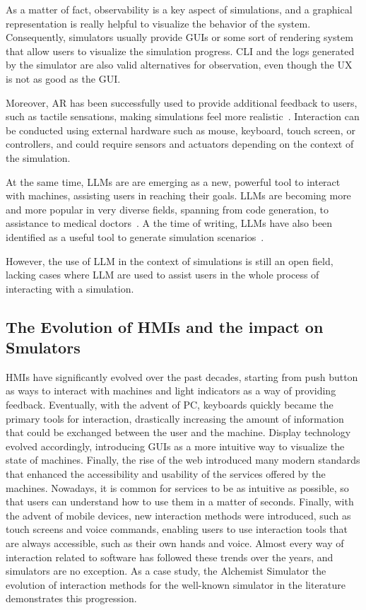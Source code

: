 \documentclass[conference]{IEEEtran}
\begin{document}
As a matter of fact,
observability is a key aspect of simulations,
and a graphical representation is really helpful to visualize the behavior of the system.
%
Consequently,
simulators usually provide \acp{GUI} or some sort of rendering system that allow users to visualize the simulation progress.
%
\ac{CLI} and the logs generated by the simulator are also valid alternatives for observation,
even though the \ac{UX} is not as good as the \ac{GUI}.

Moreover,
\ac{AR} has been successfully used to provide additional feedback to users,
such as tactile sensations,
making simulations feel more realistic~\cite{Jud2020}.
%
Interaction can be conducted using external hardware such as mouse, keyboard, touch screen, or controllers,
and could require sensors and actuators depending on the context of the simulation.

At the same time,
\ac{LLM}s are are emerging as a new, powerful tool to interact with machines,
assisting users in reaching their goals.
%
\acp{LLM} are becoming more and more popular in very diverse fields,
spanning from code generation,
to assistance to medical doctors~\cite{Wu2024}.
%
A the time of writing,
\acp{LLM} have also been identified as a useful tool to generate simulation scenarios~\cite{Zhang2023}.

However,
the use of \ac{LLM} in the context of simulations is still an open field,
lacking cases where \ac{LLM} are used to assist users in the whole process of interacting with a simulation.

\subsection{The Evolution of \acp{HMI} and the impact on Smulators}

\acp{HMI} have significantly evolved over the past decades,
starting from push button as ways to interact with machines and light indicators as a way of providing feedback.
%
Eventually,
with the advent of \ac{PC},
keyboards quickly became the primary tools for interaction,
drastically increasing the amount of information that could be exchanged between the user and the machine.
%
Display technology evolved accordingly,
introducing \acp{GUI} as a more intuitive way to visualize the state of machines.
%
Finally,
the rise of the web introduced many modern standards that enhanced the accessibility and usability of the services offered by the machines.
%
Nowadays,
it is common for services to be as intuitive as possible,
so that users can understand how to use them in a matter of seconds.
%
Finally,
with the advent of mobile devices,
new interaction methods were introduced,
such as touch screens and voice commands,
enabling users to use interaction tools that are always accessible,
such as their own hands and voice.
%
Almost every way of interaction related to software has followed these trends over the years,
and simulators are no exception.
As a case study,
the Alchemist Simulator
the evolution of interaction methods for the well-known simulator  in the literature demonstrates this progression.
\end{document}
